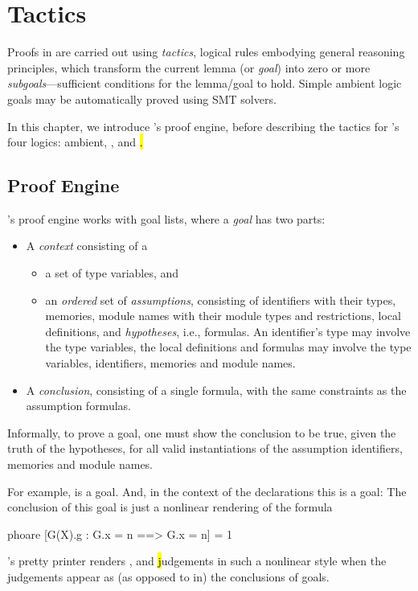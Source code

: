 \chapter{Tactics}
\label{chap:tactics}

Proofs in \EasyCrypt are carried out using \emph{tactics}, logical
rules embodying general reasoning principles, which transform the
current lemma (or \emph{goal}) into zero or more
\emph{subgoals}---sufficient conditions for the lemma/goal to
hold. Simple ambient logic goals may be automatically proved using SMT
solvers.

In this chapter, we introduce \EasyCrypt's proof engine, before
describing the tactics for \EasyCrypt's four logics: ambient, \prhl,
\phl and \hl.

\section{Proof Engine}

\EasyCrypt's proof engine works with goal lists, where a \emph{goal}
has two parts:
\begin{itemize}
\item A \emph{context} consisting of a
  \begin{itemize}
  \item a set of type variables, and

  \item an \emph{ordered} set of \emph{assumptions}, consisting of
    identifiers with their types, memories, module names with their
    module types and restrictions, local definitions, and
    \emph{hypotheses}, i.e., formulas. An identifier's type may
    involve the type variables, the local definitions and formulas may
    involve the type variables, identifiers, memories and module
    names.
  \end{itemize}

\item A \emph{conclusion}, consisting of a single formula, with
  the same constraints as the assumption formulas.
\end{itemize}
Informally, to prove a goal, one must show the conclusion to be true,
given the truth of the hypotheses, for all valid instantiations
of the assumption identifiers, memories and module names.

For example,
is a goal.
And, in the context of the declarations
this is a goal:
The conclusion of this goal is just a nonlinear rendering of the formula
\begin{easycrypt}{}{}
phoare [G(X).g : G.x = n ==> G.x = n] = 1%
\end{easycrypt}
\EasyCrypt's pretty printer renders \prhl, \phl and \hl judgements
in such a nonlinear style when the judgements appear as
(as opposed to in) the conclusions of goals.

